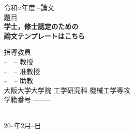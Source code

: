 
\begin{titlepage}
  \centering

{\Large 令和○年度 --論文} 
\vspace{1cm} \\
 {\Large 題目} \\
{\huge \textbf{学士，修士認定のための\protect\\論文テンプレートはこちら}}\\ 
\vspace{5cm}

  

指導教員 \vspace{0.1cm} \\
{\Large --　-- 教授} \\
{\Large --　-- 准教授} \\
{\Large --　-- 助教} \\
\vspace{1cm}
{\Large 大阪大学大学院 工学研究科 機械工学専攻}\\
  {\Large 学籍番号 --------} 
  \vspace{0.5cm} \\
  {\LARGE --　--}
\vspace{2.5cm}
  
 
  \vfill
  

    {\Large 20--年2月--日}

   
  \vfill
  
 
   
  \end{titlepage}